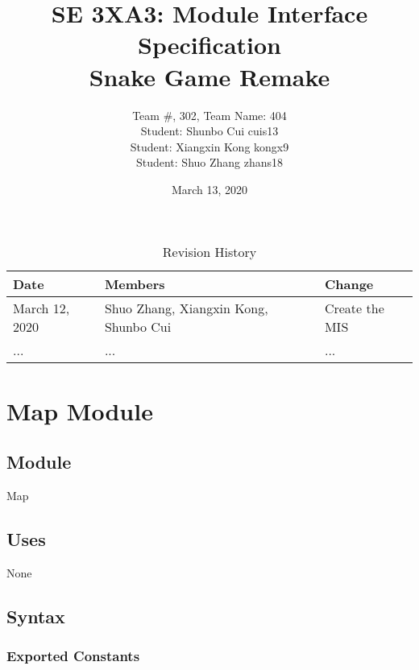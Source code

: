 \documentclass[12pt, titlepage]{article}
\title{SE 3XA3: Module Interface Specification\\\textbf{Snake Game Remake}}
\author{Team \#, 302, Team Name: 404
		\\ Student: Shunbo Cui	    cuis13
		\\ Student: Xiangxin Kong	kongx9
		\\ Student: Shuo Zhang	    zhans18
}
\date{March 13, 2020}
\begin{document}
\maketitle

\begin{table}[hp]
\caption{Revision History} \label{TblRevisionHistory}
\begin{tabularx}{\textwidth}{llX}
\toprule
\textbf{Date} & \textbf{Members} & \textbf{Change}\\
\midrule
March 12, 2020 & Shuo Zhang, Xiangxin Kong, Shunbo Cui & Create the MIS\\
... & ... & ...\\
\bottomrule
\end{tabularx}
\end{table}

\newpage
\section {Map Module}

\subsection*{Module}

Map

\subsection* {Uses}

None

\subsection* {Syntax}

\subsubsection* {Exported Constants}
\end{document}
